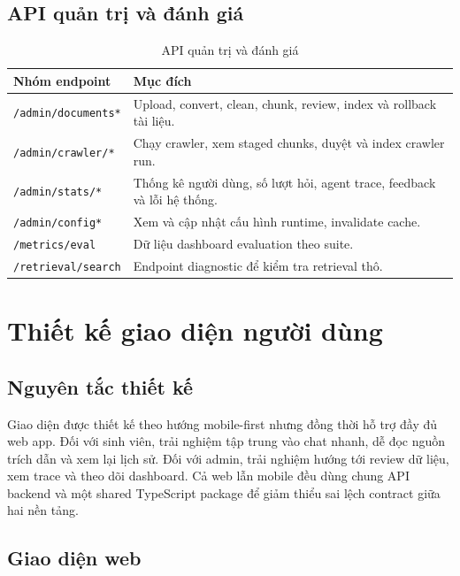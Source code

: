 \documentclass[../DoAn.tex]{subfiles}
\begin{document}
\subsection{API quản trị và đánh giá}

\begin{table}[H]
\centering
\small
\begin{tabular}{|p{4.0cm}|p{9.7cm}|}
\hline
\textbf{Nhóm endpoint} & \textbf{Mục đích} \\
\hline
\texttt{/admin/documents*} & Upload, convert, clean, chunk, review, index và
rollback tài liệu. \\
\hline
\texttt{/admin/crawler/*} & Chạy crawler, xem staged chunks, duyệt và index
crawler run. \\
\hline
\texttt{/admin/stats/*} & Thống kê người dùng, số lượt hỏi, agent trace,
feedback và lỗi hệ thống. \\
\hline
\texttt{/admin/config*} & Xem và cập nhật cấu hình runtime, invalidate cache. \\
\hline
\texttt{/metrics/eval} & Dữ liệu dashboard evaluation theo suite. \\
\hline
\texttt{/retrieval/search} & Endpoint diagnostic để kiểm tra retrieval thô. \\
\hline
\end{tabular}
\caption{API quản trị và đánh giá}
\label{tab:ch4-api-admin}
\end{table}

\section{Thiết kế giao diện người dùng}

\subsection{Nguyên tắc thiết kế}

Giao diện được thiết kế theo hướng mobile-first nhưng đồng thời hỗ trợ đầy
đủ web app. Đối với sinh viên, trải nghiệm tập trung vào chat nhanh, dễ đọc
nguồn trích dẫn và xem lại lịch sử. Đối với admin, trải nghiệm hướng tới
review dữ liệu, xem trace và theo dõi dashboard. Cả web lẫn mobile đều dùng
chung API backend và một shared TypeScript package để giảm thiểu sai lệch
contract giữa hai nền tảng.

\subsection{Giao diện web}
\end{document}

